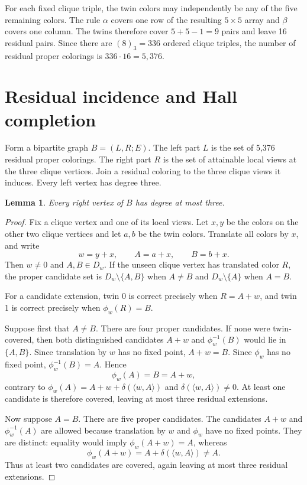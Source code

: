 \documentclass[11pt]{article}
\newtheorem{lemma}{Lemma}
\begin{document}
For each fixed clique triple, the twin colors may independently be any of the
five remaining colors. The rule $\alpha$ covers one row of the resulting
$5\times5$ array and $\beta$ covers one column. The twins therefore cover
$5+5-1=9$ pairs and leave 16 residual pairs. Since there are
$(8)_3=336$ ordered clique triples, the number of residual proper colorings is
$336\cdot16=5,376$.

\section{Residual incidence and Hall completion}
Form a bipartite graph $B=(L,R;E)$. The left part $L$ is the set of 5,376
residual proper colorings. The right part $R$ is the set of attainable local
views at the three clique vertices. Join a residual coloring to the three
clique views it induces. Every left vertex has degree three.

\begin{lemma}\label{lem:right}
Every right vertex of $B$ has degree at most three.
\end{lemma}

\begin{proof}
Fix a clique vertex and one of its local views. Let $x,y$ be the colors on the
other two clique vertices and let $a,b$ be the twin colors. Translate all
colors by $x$, and write
\[
  w=y+x,\qquad A=a+x,\qquad B=b+x.
\]
Then $w\ne0$ and $A,B\in D_w$. If the unseen clique vertex has translated
color $R$, the proper candidate set is $D_w\setminus\{A,B\}$ when $A\ne B$
and $D_w\setminus\{A\}$ when $A=B$.

For a candidate extension, twin 0 is correct precisely when $R=A+w$, and twin
1 is correct precisely when $\phi_w(R)=B$.

Suppose first that $A\ne B$. There are four proper candidates. If none were
twin-covered, then both distinguished candidates
$A+w$ and $\phi_w^{-1}(B)$ would lie in $\{A,B\}$. Since translation by $w$
has no fixed point, $A+w=B$. Since $\phi_w$ has no fixed point,
$\phi_w^{-1}(B)=A$. Hence
\[
  \phi_w(A)=B=A+w,
\]
contrary to
$\phi_w(A)=A+w+\delta(\langle w,A\rangle)$ and
$\delta(\langle w,A\rangle)\ne0$. At least one candidate is therefore
covered, leaving at most three residual extensions.

Now suppose $A=B$. There are five proper candidates. The candidates
$A+w$ and $\phi_w^{-1}(A)$ are allowed because translation by $w$ and
$\phi_w$ have no fixed points. They are distinct: equality would imply
$\phi_w(A+w)=A$, whereas
\[
  \phi_w(A+w)=A+\delta(\langle w,A\rangle)\ne A.
\]
Thus at least two candidates are covered, again leaving at most three
residual extensions.
\end{proof}
\end{document}
